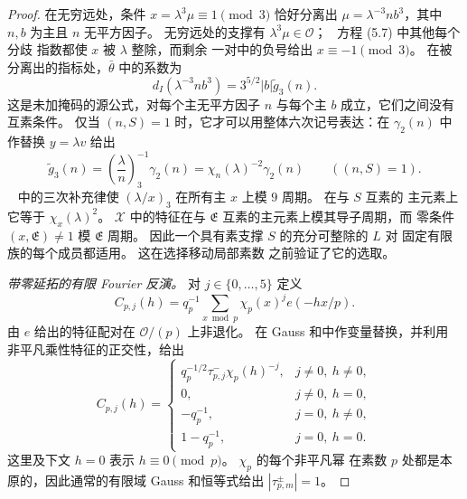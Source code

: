 \begin{proof}
在无穷远处，条件 $x=\lambda^3\mu\equiv1\pmod3$ 恰好分离出
$\mu=\lambda^{-3}nb^3$，其中 $n,b$ 为主且 $n$ 无平方因子。
无穷远处的支撑有 $\lambda^3\mu\in\mathcal O$；~\cite{DR}
方程 (5.7) 中其他每个分歧
指数都使 $x$ 被 $\lambda$ 整除，而剩余
一对中的负号给出 $x\equiv-1\pmod3$。 在被分离出的指标处，$\bar\theta$
中的系数为
\begin{equation}\label{eq:reflection-infinity-coefficient}
 d_I(\lambda^{-3}nb^3)=3^{5/2}|b|\widetilde g_3(n).
\end{equation}
这是未加掩码的源公式，对每个主无平方因子 $n$
与每个主 $b$ 成立，它们之间没有互素条件。 仅当
$(n,S)=1$ 时，它才可以用整体六次记号表达：在 $\gamma_2(n)$ 中作替换
$y=\lambda v$ 给出
\begin{equation}\label{eq:reflection-cubic-sextic-conversion}
 \widetilde g_3(n)=\left(\frac\lambda n\right)_3^{-1}\gamma_2(n)
       =\chi_n(\lambda)^{-2}\gamma_2(n)\qquad((n,S)=1).
\end{equation}
~\cite[方程 (1.5)]{DR} 中的三次补充律使
$(\lambda/x)_3$ 在所有主 $x$ 上模 $9$ 周期。 在与 $S$ 互素的
主元素上它等于 $\chi_x(\lambda)^2$。 $\mathcal X$ 中的特征在与 $\mathfrak E$
互素的主元素上模其导子周期，而
零条件 $(x,\mathfrak E)\ne1$ 模 $\mathfrak E$ 周期。
因此一个具有素支撑 $S$ 的充分可整除的 $L$ 对
固定有限族的每个成员都适用。 这在选择移动局部素数
之前验证了它的选取。

\emph{带零延拓的有限 Fourier 反演。}
对 $j\in\{0,\ldots,5\}$ 定义
\[
 C_{p,j}(h)=q_p^{-1}\sum_{x\bmod p}\chi_p(x)^j e(-hx/p).
\]
由 $e$ 给出的特征配对在
$\mathcal O/(p)$ 上非退化。 在 Gauss 和中作变量替换，并利用
非平凡乘性特征的正交性，给出
\begin{equation}\label{eq:reflection-local-fourier}
 C_{p,j}(h)=\begin{cases}
 q_p^{-1/2}\tau_{p,j}^{-}\chi_p(h)^{-j},&j\ne0,\ h\ne0,\\
 0,&j\ne0,\ h=0,\\
 -q_p^{-1},&j=0,\ h\ne0,\\
 1-q_p^{-1},&j=0,\ h=0.
 \end{cases}
\end{equation}
这里及下文 $h=0$ 表示 $h\equiv0\pmod p$。 $\chi_p$ 的每个非平凡幂
在素数 $p$ 处都是本原的，因此通常的有限域
Gauss 和恒等式给出 $|\tau_{p,m}^{\pm}|=1$。


\end{proof}

